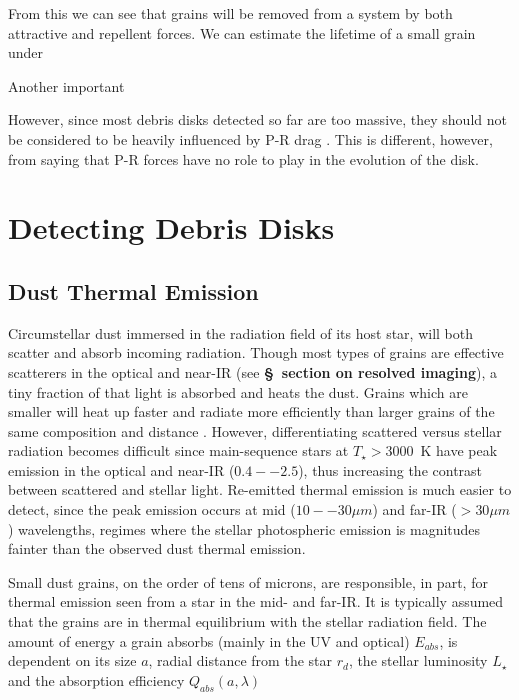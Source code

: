     
    
    From this we can see that grains will be removed from a system by both attractive and repellent forces. We can estimate the lifetime of a small grain under 
    
    Another important 
    
    
However, since most debris disks detected so far are too massive, they should not be considered to be heavily influenced by P-R drag \citep{Wyatt2005}. This is different, however, from saying that P-R forces have no role to play in the evolution of the disk.
    

\section{Detecting Debris Disks}\label{sec:detect_dd}

    \subsection{Dust Thermal Emission}

    Circumstellar dust immersed in the radiation field of its host star, will both scatter and absorb incoming radiation. Though most types of grains are effective scatterers in the optical and near-IR (see \textbf{\S~section on resolved imaging}), a tiny fraction of that light is absorbed and heats the dust. Grains which are smaller will heat up faster and radiate more efficiently than larger grains of the same composition and distance \citep{Krivov2010}. However, differentiating scattered versus stellar radiation becomes difficult since main-sequence stars at $T_\star>3000$~K have peak emission in the optical and near-IR ($0.4--2.5$\micron), thus increasing the contrast between scattered and stellar light. Re-emitted thermal emission is much easier to detect, since the peak emission occurs at mid ($10--30\mu m$) and far-IR ($>30\mu m$) wavelengths, regimes where the stellar photospheric emission is magnitudes fainter than the observed dust thermal emission.  
        
    Small dust grains, on the order of tens of microns, are responsible, in part, for thermal emission seen from a star in the mid- and far-IR. It is typically assumed that the grains are in thermal equilibrium with the stellar radiation field. The amount of energy a grain absorbs (mainly in the UV and optical) $E_{abs}$, is dependent on its size $a$, radial distance from the star $r_d$, the stellar luminosity $L_\star$ and the absorption efficiency $Q_{abs}(a,\lambda)$
    
